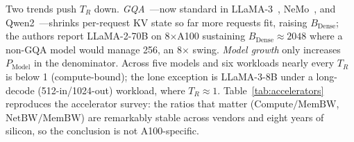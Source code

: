 \documentclass[manuscript,review]{acmart}
\newcommand{\Bdense}{B_{\mathrm{Dense}}}
\newcommand{\Pmodel}{P_{\mathrm{Model}}}
\newcommand{\membw}{\mathrm{MemBW}}
\newcommand{\compute}{\mathrm{Compute}}
\newcommand{\netbw}{\mathrm{NetBW}}
\begin{document}
Two trends push $T_R$ down. \emph{GQA}~\cite{ainslie2023gqa}---now standard in 
LLaMA-3~\cite{touvron2023llama}, NeMo~\cite{mistral2024nemo}, and 
Qwen2~\cite{cloud2024qwen2}---shrinks per-request KV state so far more requests fit, raising 
$\Bdense$; the authors report LLaMA-2-70B on 8$\times$A100 sustaining $\Bdense \approx 2048$ 
where a non-GQA model would manage 256, an 8$\times$ swing. \emph{Model growth} only increases 
$\Pmodel$ in the denominator. Across five models and six workloads nearly every $T_R$ is below 1 
(compute-bound); the lone exception is LLaMA-3-8B under a long-decode (512-in/1024-out) workload, 
where $T_R \approx 1$. Table~\ref{tab:accelerators} reproduces the accelerator survey: the ratios 
that matter ($\compute/\membw$, $\netbw/\membw$) are remarkably stable across vendors and eight years of silicon, 
so the conclusion is not A100-specific.
\end{document}
